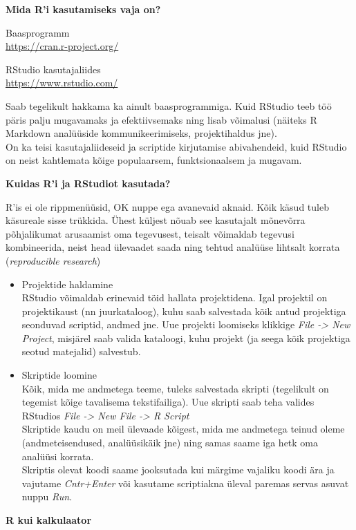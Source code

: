 \documentclass[
]{book}
\begin{document}
\textbf{Mida R'i kasutamiseks vaja on?}

Baasprogramm\\
\url{https://cran.r-project.org/}

RStudio kasutajaliides\\
\url{https://www.rstudio.com/}

Saab tegelikult hakkama ka ainult baasprogrammiga. Kuid RStudio teeb töö päris palju mugavamaks ja efektiivsemaks ning lisab võimalusi (näiteks R Markdown analüüside kommunikeerimiseks, projektihaldus jne).\\
On ka teisi kasutajaliideseid ja scriptide kirjutamise abivahendeid, kuid RStudio on neist kahtlemata kõige populaarsem, funktsionaalsem ja mugavam.

\textbf{Kuidas R'i ja RStudiot kasutada?}

R'is ei ole rippmenüüsid, OK nuppe ega avanevaid aknaid. Kõik käsud tuleb käsureale sisse trükkida. Ühest küljest nõuab see kasutajalt mõnevõrra põhjalikumat arusaamist oma tegevusest, teisalt võimaldab tegevusi kombineerida, neist head ülevaadet saada ning tehtud analüüse lihtsalt korrata (\emph{reproducible research})

\begin{itemize}
\item
  Projektide haldamine\\
  RStudio võimaldab erinevaid töid hallata projektidena. Igal projektil on projektikaust (nn juurkataloog), kuhu saab salvestada kõik antud projektiga seonduvad scriptid, andmed jne. Uue projekti loomiseks klikkige \emph{File -\textgreater{} New Project}, misjärel saab valida kataloogi, kuhu projekt (ja seega kõik projektiga seotud matejalid) salvestub.
\item
  Skriptide loomine\\
  Kõik, mida me andmetega teeme, tuleks salvestada skripti (tegelikult on tegemist kõige tavalisema tekstifailiga). Uue skripti saab teha valides RStudios \emph{File -\textgreater{} New File -\textgreater{} R Script}\\
  Skriptide kaudu on meil ülevaade kõigest, mida me andmetega teinud oleme (andmeteisendused, analüüsikäik jne) ning samas saame iga hetk oma analüüsi korrata.\\
  Skriptis olevat koodi saame jooksutada kui märgime vajaliku koodi ära ja vajutame \emph{Cntr+Enter} või kasutame scriptiakna üleval paremas servas asuvat nuppu \emph{Run}.
\end{itemize}

\textbf{R kui kalkulaator}
\end{document}
